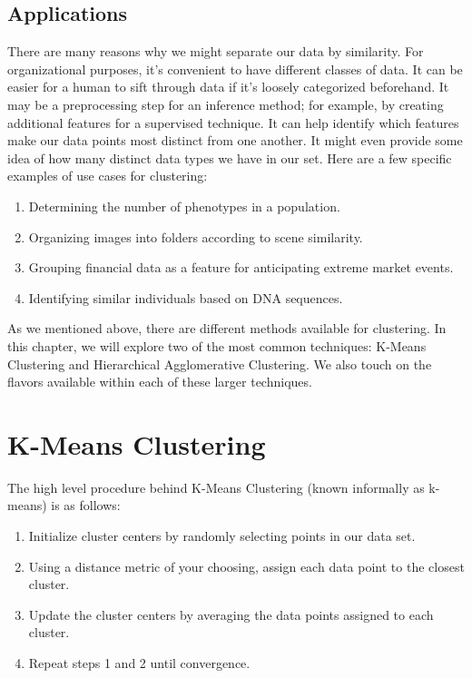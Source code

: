 \subsection{Applications}
There are many reasons why we might separate our data by similarity. For organizational purposes, it's convenient to have different classes of data. It can be easier for a human to sift through data if it's loosely categorized beforehand. It may be a preprocessing step for an inference method; for example, by creating additional features for a supervised technique. It can help identify which features make our data points most distinct from one another. It might even provide some idea of how many distinct data types we have in our set. Here are a few specific examples of use cases for clustering:

\begin{enumerate}
    \item Determining the number of phenotypes in a population.
    \item Organizing images into folders according to scene similarity.
    \item Grouping financial data as a feature for anticipating extreme market events.
    \item Identifying similar individuals based on DNA sequences.
\end{enumerate}

As we mentioned above, there are different methods available for clustering. In this chapter, we will explore two of the most common techniques: K-Means Clustering and Hierarchical Agglomerative Clustering. We also touch on the flavors available within each of these larger techniques.

\section{K-Means Clustering}
The high level procedure behind K-Means Clustering (known informally as k-means) is as follows:

\begin{enumerate}
    \item Initialize cluster centers by randomly selecting points in our data set.
    \item Using a distance metric of your choosing, assign each data point to the closest cluster.
    \item Update the cluster centers by averaging the data points assigned to each cluster.
    \item Repeat steps 1 and 2 until convergence.
\end{enumerate}

